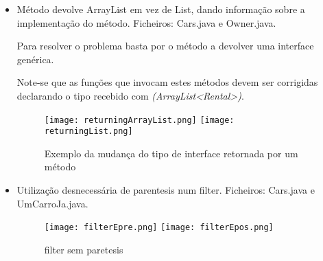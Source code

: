 \begin{itemize}
\item Método devolve ArrayList em vez de List, dando informação sobre a implementação do método.\newline
 Ficheiros: Cars.java e Owner.java.\newline


\par Para resolver o problema basta por o método a devolver uma interface genérica.\newline
\par Note-se que as funções que invocam estes métodos devem ser corrigidas declarando o tipo recebido com \textit{(ArrayList<Rental>)}.

\begin{figure}[H]

  \centering

  \texttt{[image: returningArrayList.png]}
  \texttt{[image: returningList.png]}

  \caption {Exemplo da mudança do tipo de interface retornada por um método}

  \label {fig22}

\end{figure}

\end{itemize}

\begin{itemize}
\item Utilização desnecessária de parentesis num filter.\newline
 Ficheiros: Cars.java e UmCarroJa.java.\newline


\begin{figure}[H]

  \centering

  \texttt{[image: filterEpre.png]}
  \texttt{[image: filterEpos.png]}

  \caption {filter sem paretesis}

  \label {fig23}

\end{figure}

\end{itemize}


